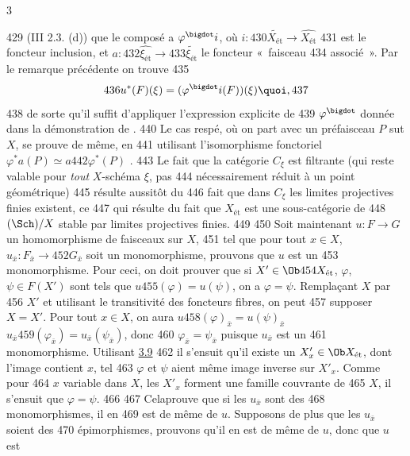 3	\documentclass[10pt]{../fichiers-configuration-latex/smfart}
\begin{document}
   429	(III 2.3. (d)) que le composé a $\varphi^{\bigdot} i$, où $i :
   430	\widetilde{X_{\text{ét}}} \to \widehat{X_{\text{ét}}}$
   431	est le foncteur inclusion, et $a :
   432	\widehat{\xi_{\text{ét}}} \to
   433	\widetilde{\xi_{\text{ét}}}$ le foncteur « faisceau
   434	associé ». Par le remarque précédente on trouve
   435	$$
   436	u^{\ast} (F) (\xi) = (\varphi^{\bigdot} i(F)) (\xi){\quoi},
   437	$$
   438	de sorte qu'il suffit d'appliquer l'expression explicite de
   439	$\varphi^{\bigdot}$ donnée dans la démonstration de . %
   440	Le cas respé, où on part avec un préfaisceau $P$ sut $X$, se prouve de même, en
   441	utilisant l'isomorphisme fonctoriel $\varphi^{\ast} a(P) \simeq a
   442	\varphi^{\ast} (P)$ . %
   443	Le fait que la catégorie $C_{\xi}$ est filtrante (qui reste valable pour \emph{tout} $X$-schéma $\xi$, pas
   444	nécessairement réduit à un point géométrique)
   445	résulte aussitôt du
   446	fait que dans $C_{\xi}$ les limites projectives finies existent, ce
   447	qui résulte du fait que $X_{\text{ét}}$ est une sous-catégorie de
   448	$(\Sch) /X$ stable par limites projectives finies.
   449	
   450	Soit maintenant $u : F \to G$ un homomorphisme de faisceaux sur $X$,
   451	tel que pour tout $x \in X$, $u_{\bar{x}} : F_{\bar{x}} \to
   452	G_{\bar{x}}$ soit un monomorphisme, prouvons que $u$ est un
   453	monomorphisme. Pour ceci, on doit prouver que si $X'\in \Ob
   454	X_{\text{ét}}$, $\varphi$, $\psi \in F(X')$ sont tels que $u
   455	(\varphi) = u (\psi)$, on a $\varphi = \psi$. Remplaçant $X$ par
   456	$X'$ et utilisant le transitivité des foncteurs fibres, on peut
   457	supposer $X = X'$. Pour tout $x \in X$, on aura $u
   458	(\varphi)_{\bar{x}} = u (\psi)_{\bar{x}}$ \ie $u_{\bar{x}}
   459	(\varphi_{\bar{x}}) = u_{\bar{x}} (\psi_{\bar{x}})$, donc
   460	$\varphi_{\bar{x}} = \psi_{\bar{x}}$ puisque $u_{\bar{x}}$ est un
   461	monomorphisme. Utilisant \hyperref[VIII.prop3.9]{3.9} %
   462	il s'ensuit qu'il existe un $X'_x \in \Ob X_{\text{ét}}$, dont l'image contient $x$, tel
   463	$\varphi$ et $\psi$ aient même image inverse sur $X'_x$. Comme pour
   464	$x$ variable dans $X$, les $X'_x$ forment une famille couvrante de
   465	$X$, il s'ensuit que $\varphi = \psi$.
   466	
   467	Cela\pageoriginale prouve que si les $u_{\bar{x}}$ sont des
   468	monomorphismes, il en
   469	est de même de $u$. Supposons de plus que les $u_{\bar{x}}$ soient des
   470	épimorphismes, prouvons qu'il en est de même de $u$, donc que $u$ est
\end{document}
